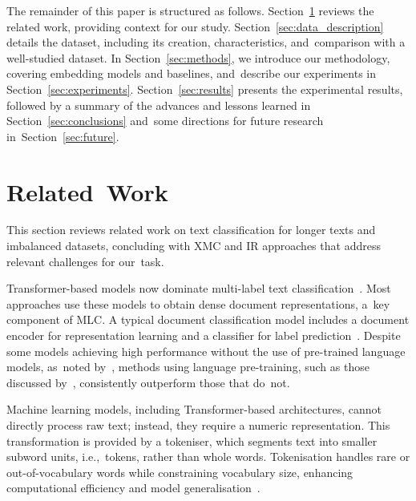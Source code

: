 \documentclass[make,article,accept,pdftex,moreauthors]{Definitions/mdpi}
\begin{document}
The remainder of this paper is structured as follows. 
Section~\ref{sec:related_work} reviews the related work, providing context for our study. 
Section~\ref{sec:data_description} details the dataset, including its creation, characteristics, and~comparison with a well-studied dataset. 
In Section~\ref{sec:methods}, we introduce our methodology, covering embedding models and baselines, and~describe our experiments in Section~\ref{sec:experiments}. 
Section~\ref{sec:results} presents the experimental results, followed by a summary of the advances and lessons learned in Section~\ref{sec:conclusions} and~some directions for future research \mbox{in Section~\ref{sec:future}.}


\section{Related~Work}
\label{sec:related_work}

This section reviews related work on text classification for longer texts and imbalanced datasets, concluding with XMC and IR approaches that address relevant challenges for our~task.

Transformer-based models now dominate multi-label text classification~\citep{tarekegn2024deeplearningmultilabellearning}. 
Most approaches use these models to obtain dense document representations, a~key component of MLC. 
A typical document classification model includes a document encoder for representation learning and a classifier for label prediction~\citep{dai2022revisitingtransformer}.
Despite some models achieving high performance without the use of pre-trained language models, as~noted by~\citep{duan2022fusiontwostream,liu2022cnle}, methods using language pre-training, such as those discussed by~\citep{yarullin2020bertforseq, fallah2023exploitinglabeldependencies, li2024kenet}, consistently outperform those that do~not.

Machine learning models, including Transformer-based architectures, cannot directly process raw text; instead, they require a numeric representation. 
This transformation is provided by a tokeniser, which segments text into smaller subword units, i.e.,~tokens, rather than whole words.
Tokenisation handles rare or out-of-vocabulary words while constraining vocabulary size, enhancing computational efficiency and model generalisation~\citep{sennrich2016bpeusage, kudo-richardson2018sentencepiece}.
\end{document}
